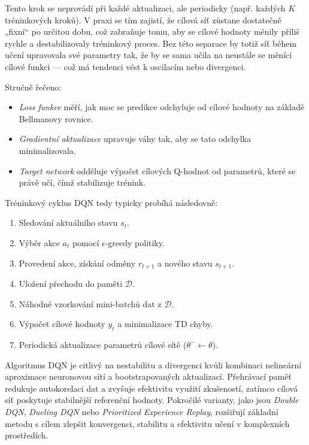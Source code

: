 Tento krok se neprovádí při každé aktualizaci, ale periodicky (např. každých \(K\) tréninkových kroků). V praxi se tím zajistí, že cílová síť zůstane dostatečně „fixní“ po určitou dobu, což zabraňuje tomu, aby se cílové hodnoty měnily příliš rychle a destabilizovaly tréninkový proces. Bez této separace by totiž síť během učení upravovala své parametry tak, že by se sama učila na neustále se měnící cílové funkci — což má tendenci vést k oscilacím nebo divergenci.

Stručně řečeno:
\begin{itemize}
    \item \textit{Loss funkce} měří, jak moc se predikce odchyluje od cílové hodnoty na základě Bellmanovy rovnice.
    \item \textit{Gradientní aktualizace} upravuje váhy tak, aby se tato odchylka minimalizovala.
    \item \textit{Target network} odděluje výpočet cílových Q-hodnot od parametrů, které se právě učí, čímž stabilizuje trénink.
\end{itemize}

Tréninkový cyklus DQN tedy typicky probíhá následovně:

\begin{enumerate}
    \item Sledování aktuálního stavu \(s_t\).
    \item Výběr akce \(a_t\) pomocí \(\epsilon\)-greedy politiky.
    \item Provedení akce, získání odměny \(r_{t+1}\) a nového stavu \(s_{t+1}\).
    \item Uložení přechodu do paměti \(\mathcal{D}\).
    \item Náhodné vzorkování mini-batchů dat z \(\mathcal{D}\).
    \item Výpočet cílové hodnoty \(y_t\) a minimalizace TD chyby.
    \item Periodická aktualizace parametrů cílové sítě (\(\theta^- \leftarrow \theta\)).
\end{enumerate}

Algoritmus DQN je citlivý na nestabilitu a divergenci kvůli kombinaci nelineární aproximace neuronovou sítí a bootstrapovaných aktualizací. Přehrávací paměť redukuje autokorelaci dat a zvyšuje efektivitu využití zkušeností, zatímco cílová síť poskytuje stabilnější referenční hodnoty. Pokročilé varianty, jako jsou \textit{Double DQN}, \textit{Dueling DQN} nebo \textit{Prioritized Experience Replay}, rozšiřují základní metodu s cílem zlepšit konvergenci, stabilitu a efektivitu učení v komplexních prostředích.

